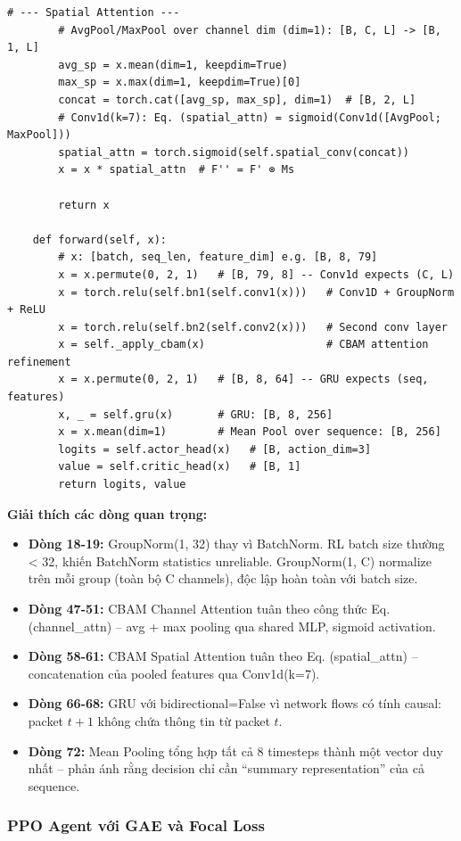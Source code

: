 \documentclass[12pt,a4paper]{article}
\begin{document}
\begin{lstlisting}[caption=CNN-GRU-CBAM Backbone Implementation, label=lst:backbone]
        # --- Spatial Attention ---
        # AvgPool/MaxPool over channel dim (dim=1): [B, C, L] -> [B, 1, L]
        avg_sp = x.mean(dim=1, keepdim=True)
        max_sp = x.max(dim=1, keepdim=True)[0]
        concat = torch.cat([avg_sp, max_sp], dim=1)  # [B, 2, L]
        # Conv1d(k=7): Eq. (spatial_attn) = sigmoid(Conv1d([AvgPool; MaxPool]))
        spatial_attn = torch.sigmoid(self.spatial_conv(concat))
        x = x * spatial_attn  # F'' = F' ⊗ Ms

        return x

    def forward(self, x):
        # x: [batch, seq_len, feature_dim] e.g. [B, 8, 79]
        x = x.permute(0, 2, 1)   # [B, 79, 8] -- Conv1d expects (C, L)
        x = torch.relu(self.bn1(self.conv1(x)))   # Conv1D + GroupNorm + ReLU
        x = torch.relu(self.bn2(self.conv2(x)))   # Second conv layer
        x = self._apply_cbam(x)                   # CBAM attention refinement
        x = x.permute(0, 2, 1)   # [B, 8, 64] -- GRU expects (seq, features)
        x, _ = self.gru(x)       # GRU: [B, 8, 256]
        x = x.mean(dim=1)        # Mean Pool over sequence: [B, 256]
        logits = self.actor_head(x)   # [B, action_dim=3]
        value = self.critic_head(x)   # [B, 1]
        return logits, value
\end{lstlisting}

\textbf{Giải thích các dòng quan trọng:}
\begin{itemize}
    \item \textbf{Dòng 18-19:} GroupNorm(1, 32) thay vì BatchNorm. RL batch size thường < 32, khiến BatchNorm statistics unreliable. GroupNorm(1, C) normalize trên mỗi group (toàn bộ C channels), độc lập hoàn toàn với batch size.
    \item \textbf{Dòng 47-51:} CBAM Channel Attention tuân theo công thức Eq. (channel\_attn) -- avg + max pooling qua shared MLP, sigmoid activation.
    \item \textbf{Dòng 58-61:} CBAM Spatial Attention tuân theo Eq. (spatial\_attn) -- concatenation của pooled features qua Conv1d(k=7).
    \item \textbf{Dòng 66-68:} GRU với bidirectional=False vì network flows có tính causal: packet $t+1$ không chứa thông tin từ packet $t$.
    \item \textbf{Dòng 72:} Mean Pooling tổng hợp tất cả 8 timesteps thành một vector duy nhất -- phản ánh rằng decision chỉ cần ``summary representation'' của cả sequence.
\end{itemize}

\subsubsection{PPO Agent với GAE và Focal Loss}
\end{document}
